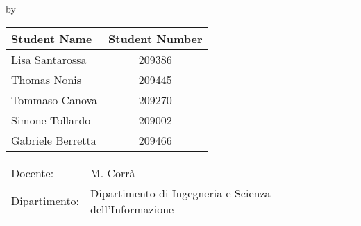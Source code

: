 \begin{titlepage}

\begin{center}

{\makeatletter
\largetitlestyle\fontsize{28}{28}\selectfont\@title
\makeatother}

{\makeatletter
\ifdefvoid{\@subtitle}{}{\bigskip\titlestyle\fontsize{15}{15}\selectfont\@subtitle}
\makeatother}

\bigskip
\bigskip

by
 
\bigskip
\bigskip

\setlength\extrarowheight{2pt}
\begin{tabular}{lc}
    Student Name & Student Number \\\midrule
    Lisa Santarossa & 209386\\
    Thomas Nonis & 209445\\
    Tommaso Canova & 209270\\
    Simone Tollardo & 209002\\
    Gabriele Berretta & 209466 \\
\end{tabular}

\vfill

\begin{tabular}{ll}
    Docente: & M. Corrà \\
    Dipartimento: & Dipartimento di Ingegneria e Scienza dell'Informazione
\end{tabular}

\bigskip
\bigskip

\end{center}

\end{titlepage}
